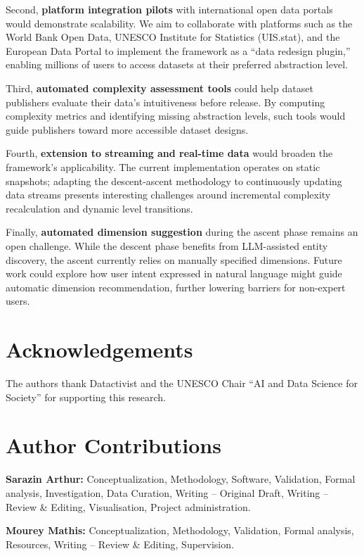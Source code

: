 \documentclass[12pt,a4paper]{article}
\begin{document}
Second, \textbf{platform integration pilots} with international open data portals would demonstrate scalability. We aim to collaborate with platforms such as the World Bank Open Data, UNESCO Institute for Statistics (UIS.stat), and the European Data Portal to implement the framework as a ``data redesign plugin,'' enabling millions of users to access datasets at their preferred abstraction level.

Third, \textbf{automated complexity assessment tools} could help dataset publishers evaluate their data's intuitiveness before release. By computing complexity metrics and identifying missing abstraction levels, such tools would guide publishers toward more accessible dataset designs.

Fourth, \textbf{extension to streaming and real-time data} would broaden the framework's applicability. The current implementation operates on static snapshots; adapting the descent-ascent methodology to continuously updating data streams presents interesting challenges around incremental complexity recalculation and dynamic level transitions.

Finally, \textbf{automated dimension suggestion} during the ascent phase remains an open challenge. While the descent phase benefits from LLM-assisted entity discovery, the ascent currently relies on manually specified dimensions. Future work could explore how user intent expressed in natural language might guide automatic dimension recommendation, further lowering barriers for non-expert users.

\section*{Acknowledgements}
The authors thank Datactivist and the UNESCO Chair ``AI and Data Science for Society'' for supporting this research.

\section*{Author Contributions}
\textbf{Sarazin Arthur:} Conceptualization, Methodology, Software, Validation, Formal analysis, Investigation, Data Curation, Writing – Original Draft, Writing – Review \& Editing, Visualisation, Project administration.

\textbf{Mourey Mathis:} Conceptualization, Methodology, Validation, Formal analysis, Resources, Writing – Review \& Editing, Supervision.
\end{document}
